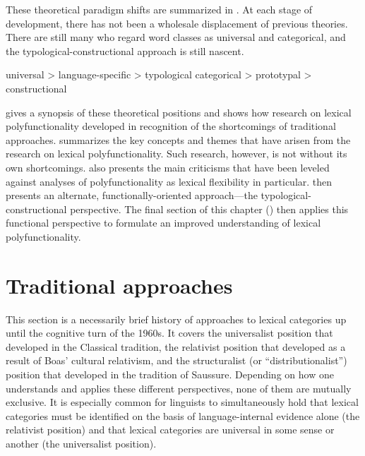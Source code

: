 These theoretical paradigm shifts are summarized in . At each stage of development, there has not been a wholesale displacement of previous theories. There are still many who regard word classes as universal and categorical, and the typological-constructional approach is still nascent.

\begin{exe}
  \ex\label{ex:2.1}
  \begin{xlist}
    \ex universal > language-specific > typological
    \ex categorical > prototypal > constructional
  \end{xlist}
\end{exe}

 gives a synopsis of these theoretical positions and shows how research on lexical polyfunctionality developed in recognition of the shortcomings of traditional approaches.  summarizes the key concepts and themes that have arisen from the research on lexical polyfunctionality. Such research, however, is not without its own shortcomings.  also presents the main criticisms that have been leveled against analyses of polyfunctionality as lexical flexibility in particular.  then presents an alternate, functionally-oriented approach—the typological-constructional perspective. The final section of this chapter () then applies this functional perspective to formulate an improved understanding of lexical polyfunctionality.

\section{Traditional approaches}
\label{sec:2.2}

This section is a necessarily brief history of approaches to lexical categories up until the cognitive turn of the 1960s. It covers the universalist position that developed in the Classical tradition, the relativist position that developed as a result of Boas' cultural relativism, and the structuralist (or \enquote{distributionalist}) position that developed in the tradition of Saussure. Depending on how one understands and applies these different perspectives, none of them are mutually exclusive. It is especially common for linguists to simultaneously hold that lexical categories must be identified on the basis of language-internal evidence alone (the relativist position) and that lexical categories are universal in some sense or another (the universalist position).

